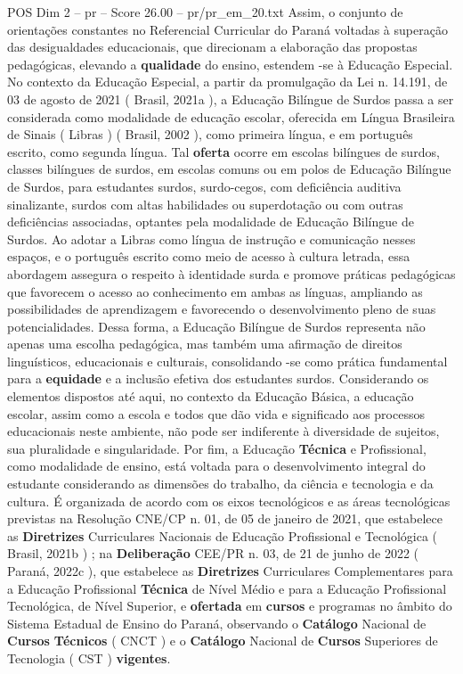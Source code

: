\begin{textsample}{POS Dim 2 – pr – Score 26.00 – pr/pr\_em\_20.txt}
Assim, o conjunto de orientações constantes no Referencial Curricular do Paraná voltadas à superação das desigualdades educacionais, que direcionam a elaboração das propostas pedagógicas, elevando a \textbf{qualidade} do ensino, estendem -se à Educação Especial.
No contexto da Educação Especial, a partir da promulgação da Lei n. 14.191, de 03 de agosto de 2021 ( Brasil, 2021a ), a Educação Bilíngue de Surdos passa a ser considerada como modalidade de educação escolar, oferecida em Língua Brasileira de Sinais ( Libras ) ( Brasil, 2002 ), como primeira língua, e em português escrito, como segunda língua.
Tal \textbf{oferta} ocorre em escolas bilíngues de surdos, classes bilíngues de surdos, em escolas comuns ou em polos de Educação Bilíngue de Surdos, para estudantes surdos, surdo-cegos, com deficiência auditiva sinalizante, surdos com altas habilidades ou superdotação ou com outras deficiências associadas, optantes pela modalidade de Educação Bilíngue de Surdos.
Ao adotar a Libras como língua de instrução e comunicação nesses espaços, e o português escrito como meio de acesso à cultura letrada, essa abordagem assegura o respeito à identidade surda e promove práticas pedagógicas que favorecem o acesso ao conhecimento em ambas as línguas, ampliando as possibilidades de aprendizagem e favorecendo o desenvolvimento pleno de suas potencialidades.
Dessa forma, a Educação Bilíngue de Surdos representa não apenas uma escolha pedagógica, mas também uma afirmação de direitos linguísticos, educacionais e culturais, consolidando -se como prática fundamental para a \textbf{equidade} e a inclusão efetiva dos estudantes surdos.
Considerando os elementos dispostos até aqui, no contexto da Educação Básica, a educação escolar, assim como a escola e todos que dão vida e significado aos processos educacionais neste ambiente, não pode ser indiferente à diversidade de sujeitos, sua pluralidade e singularidade.
Por fim, a Educação \textbf{Técnica} e Profissional, como modalidade de ensino, está voltada para o desenvolvimento integral do estudante considerando as dimensões do trabalho, da ciência e tecnologia e da cultura.
É organizada de acordo com os eixos tecnológicos e as áreas tecnológicas previstas na Resolução CNE/CP n. 01, de 05 de janeiro de 2021, que estabelece as \textbf{Diretrizes} Curriculares Nacionais de Educação Profissional e Tecnológica ( Brasil, 2021b ) ; na \textbf{Deliberação} CEE/PR n. 03, de 21 de junho de 2022 ( Paraná, 2022c ), que estabelece as \textbf{Diretrizes} Curriculares Complementares para a Educação Profissional \textbf{Técnica} de Nível Médio e para a Educação Profissional Tecnológica, de Nível Superior, e \textbf{ofertada} em \textbf{cursos} e programas no âmbito do Sistema Estadual de Ensino do Paraná, observando o \textbf{Catálogo} Nacional de \textbf{Cursos} \textbf{Técnicos} ( CNCT ) e o \textbf{Catálogo} Nacional de \textbf{Cursos} Superiores de Tecnologia ( CST ) \textbf{vigentes}.

\end{textsample}
